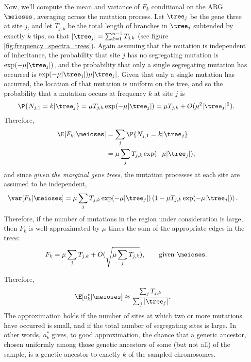 Now, we'll compute the mean and variance of $F_k$
conditional on the ARG $\meioses$, averaging across the mutation process.
Let $\tree_j$ be the gene three at site $j$,
and let $T_{j,k}$ be the total length of branches in $\tree_j$ subtended by exactly $k$ tips,
so that $|\tree_j| = \sum_{k=1}^{n-1} T_{j,k}$
(see figure \ref{fig:frequency_spectra_trees}).
Again assuming that the mutation is independent of inheritance,
the probability that site $j$ has no segregating mutation is $\exp(-\mu |\tree_j|)$,
and the probability that only a single segregating mutation has occurred is $\exp(-\mu |\tree_j|) \mu |\tree_j|$.
Given that only a single mutation has occurred,
the location of that mutation is uniform on the tree,
and so the probability that a mutation occurs at frequency $k$ at site $j$ is
\[
\P\{ N_{j,1}=k \vert \tree_j \}
  = \mu T_{j,k}  \exp(-\mu |\tree_j|)  = \mu T_{j,k} + O(\mu^2 |\tree_j|^2).
\]
Therefore, 
\begin{align}
  \E[ F_k \vert \meioses ] &= \sum_j \P\{ N_{j,1}=k \vert \tree_j \} \\
        &= \mu \sum_j T_{j,k}  \exp(-\mu |\tree_j|) ,
\end{align}
and since \emph{given the marginal gene trees}, the mutation processes at each site are assumed to be independent,
\begin{align}
  \var[ F_k \vert \meioses ] &= \mu \sum_j T_{j,k}  \exp(-\mu |\tree_j|) \left( 1 - \mu T_{j,k}  \exp(-\mu |\tree_j|) \right).
\end{align}
Therefore, if the number of mutations in the region under consideration is large,
then $F_k$ is well-approximated by $\mu$ times the sum of the appropriate edges in the trees:
\begin{align}
    F_k = \mu \sum_j T_{j,k} + O( \sqrt{\mu \sum_j T_{j,k}} ) , \qquad \text{given $\meioses$}.
\end{align}


Therefore, %
\begin{align}
    \E[ a^*_k \vert \meioses ] &\approx \frac{ \sum_j T_{j,k} }{ \sum_j |\tree_j| }  .
\end{align}
The approximation holds if the number of sites at which two or more mutations have occurred is small,
and if the total number of segregating sites is large.
In other words, $a_k^*$ gives, to good approximation, 
the chance that a genetic ancestor,
chosen uniformly among those genetic ancestors of some (but not all) of the sample,
is a genetic ancestor to exactly $k$ of the sampled chromosomes.




